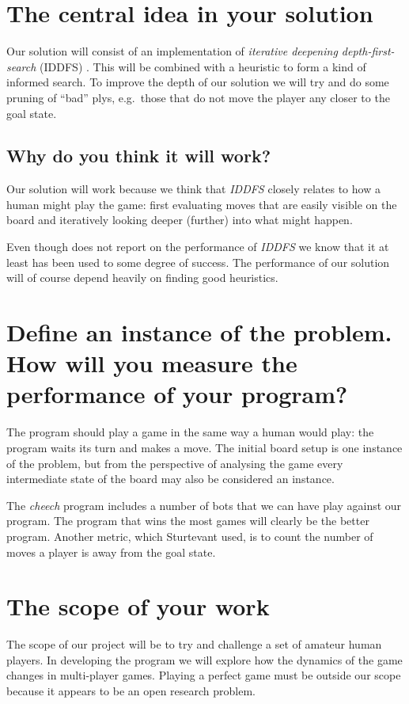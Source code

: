 \documentclass[a4paper,11pt]{report}
\begin{document}
\section{The central idea in your solution}
Our solution will consist of an implementation of \emph{iterative
  deepening depth-first-search} (IDDFS) \cite{aimodern}. This will be
combined with a heuristic to form a kind of informed search. To
improve the depth of our solution we will try and do some pruning of
``bad'' plys, e.g.~those that do not move the player any closer to the
goal state.

\subsection{Why do you think it will work?}
Our solution will work because we think that \emph{IDDFS} closely
relates to how a human might play the game: first evaluating
moves that are easily visible on the board and iteratively looking
deeper (further) into what might happen.

Even though \cite{Huang:2001:SGP:378593.378708} does not report on the
performance of \emph{IDDFS} we know that it at least has been used to
some degree of success. The performance of our solution will of course
depend heavily on finding good heuristics.

\section{Define an instance of the problem. How will you measure the performance of your program?} 

The program should play a game in the same way a human would play: the
program waits its turn and makes a move. The initial board setup is
one instance of the problem, but from the perspective of analysing the
game every intermediate state of the board may also be considered an
instance.

The \emph{cheech} program includes a number of bots that we can have
play against our program. The program that wins the most games will
clearly be the better program. Another metric, which Sturtevant used,
is to count the number of moves a player is away from the goal state.

\section{The scope of your work} 
The scope of our project will be to try and challenge a set of amateur
human players. In developing the program we will explore how the
dynamics of the game changes in multi-player games. Playing a perfect
game must be outside our scope because it appears to be an open
research problem.
\end{document}

